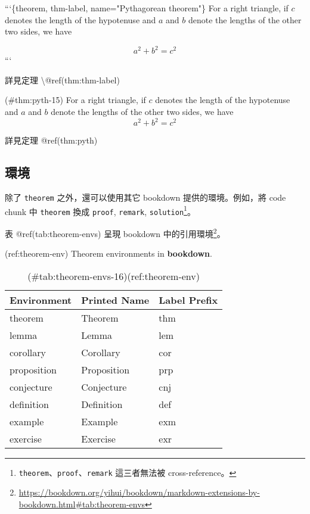 \documentclass[oneside]{book}
\newenvironment{Shaded}{\begin{snugshade}}{\end{snugshade}}
\newcommand{\BaseNTok}[1]{\textcolor[rgb]{0.00,0.00,0.81}{#1}}
\newcommand{\NormalTok}[1]{#1}
\renewcommand{\href}[2]{#2\footnote{\url{#1}}}
\begin{document}
\begin{Shaded}
\begin{Highlighting}[]
\BaseNTok{```\{theorem, thm-label, name="Pythagorean theorem"\}}
\BaseNTok{For a right triangle, if $c$ denotes the length of the hypotenuse}
\BaseNTok{and $a$ and $b$ denote the lengths of the other two sides, we have}

\BaseNTok{$$a^2 + b^2 = c^2$$}
\BaseNTok{```}

\NormalTok{詳見定理 \textbackslash{}@ref(thm:thm-label)}
\end{Highlighting}
\end{Shaded}

\BeginKnitrBlock{theorem}\iffalse{-91-80-121-116-104-97-103-111-114-101-97-110-32-116-104-101-111-114-101-109-93-}\fi{}

\protect\hypertarget{thm:pyth-15}{}{(\#thm:pyth-15) \iffalse (Pythagorean theorem) \fi{} }For a right triangle, if \(c\) denotes the length of the hypotenuse
and \(a\) and \(b\) denote the lengths of the other two sides, we have
\[a^2 + b^2 = c^2\]


詳見定理 @ref(thm:pyth)

\hypertarget{environment}{%
\subsection{環境}\label{environment}}

除了 \texttt{theorem} 之外，還可以使用其它 bookdown 提供的環境。例如，將 code chunk 中 \texttt{theorem} 換成 \texttt{proof}, \texttt{remark}, \texttt{solution}\footnote{\texttt{theorem}、\texttt{proof}、\texttt{remark} 這三者無法被 cross-reference。}。

表 @ref(tab:theorem-envs) 呈現 bookdown 中的\href{https://bookdown.org/yihui/bookdown/markdown-extensions-by-bookdown.html\#tab:theorem-envs}{引用環境}。

(ref:theorem-env) Theorem environments in \textbf{bookdown}.

\begin{table}

\caption{(\#tab:theorem-envs-16)(ref:theorem-env)}
\centering
\begin{tabular}[t]{lll}
\toprule
Environment & Printed Name & Label Prefix\\
\midrule
theorem & Theorem & thm\\
lemma & Lemma & lem\\
corollary & Corollary & cor\\
proposition & Proposition & prp\\
conjecture & Conjecture & cnj\\
\addlinespace
definition & Definition & def\\
example & Example & exm\\
exercise & Exercise & exr\\
\bottomrule
\end{tabular}
\end{table}
\end{document}
